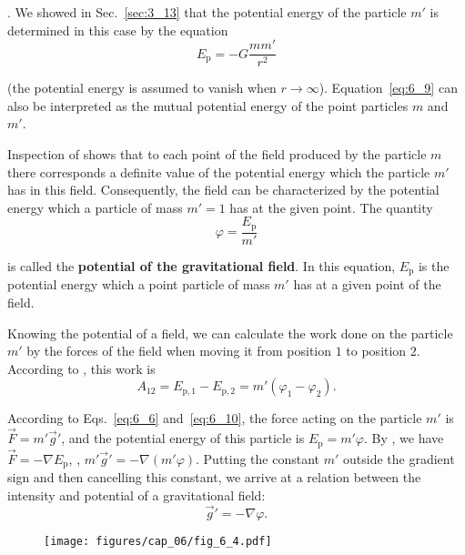 . We showed in Sec.~\ref{sec:3_13} that the potential energy of the particle $m'$ is determined in this case by the equation
\begin{equation}\label{eq:6_9}
	E_{\text{p}} = -G\frac{mm'}{r^2}
\end{equation}

\noindent
(the potential energy is assumed to vanish when $r\to\infty$). Equation~\eqref{eq:6_9} can also be interpreted as the mutual potential energy of the point particles $m$ and $m'$.

Inspection of  shows that to each point of the field produced by the particle $m$ there corresponds a definite value of the potential energy which the particle $m'$ has in this field. Consequently, the field can be characterized by the potential energy which a particle of mass $m'=1$ has at the given point. The quantity
\begin{equation}\label{eq:6_10}
	\varphi = \frac{E_{\text{p}}}{m'}
\end{equation}

\noindent
is called the \textbf{potential of the gravitational field}. In this equation, $E_{\text{p}}$ is the potential energy which a point particle of mass $m'$ has at a given point of the field.

Knowing the potential of a field, we can calculate the work done on the particle $m'$ by the forces of the field when moving it from position $1$ to position $2$. According to , this work is
\begin{equation}\label{eq:6_11}
	A_{12} = E_{\text{p},1} - E_{\text{p},2} = m'(\varphi_1 - \varphi_2).
\end{equation}

According to Eqs.~\eqref{eq:6_6} and~\eqref{eq:6_10}, the force acting on the particle $m'$ is $\vec{F}=m'\vec{g}'$, and the potential energy of this particle is $E_{\text{p}}=m'\varphi$. By , we have $\vec{F}=-\nabla E_{\text{p}}$, \ie, $m'\vec{g}'=-\nabla(m'\varphi)$. Putting the constant $m'$ outside the gradient sign and then cancelling this constant, we arrive at a relation between the intensity and potential of a gravitational field:
\begin{equation}\label{eq:6_12}
	\vec{g}' = -\nabla\varphi.
\end{equation}

\begin{figure}[t]
	\begin{center}
		\texttt{[image: figures/cap\_06/fig\_6\_4.pdf]}
		\caption[]{}
		\label{fig:6_4}
	\end{center}
	\vspace{-0.7cm}
\end{figure}

